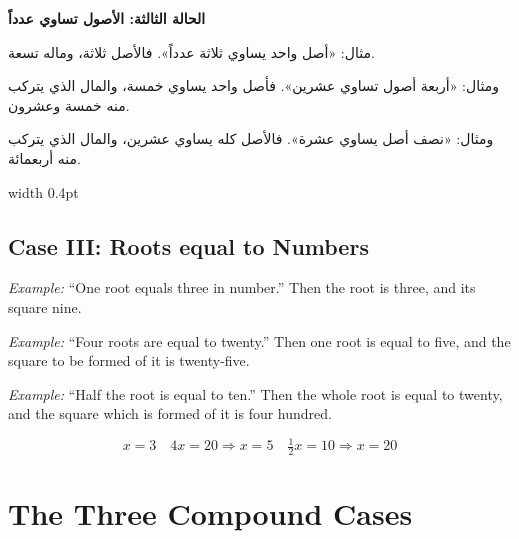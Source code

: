 \documentclass[11pt,a4paper,openany,oneside]{book}
\begin{document}
\noindent\begin{minipage}[t]{0.48\textwidth}
\raggedleft

\begin{Arabic}
\textbf{الحالة الثالثة: الأصول تساوي عدداً}

مثال: «أصل واحد يساوي ثلاثة عدداً». فالأصل ثلاثة، وماله تسعة.

ومثال: «أربعة أصول تساوي عشرين». فأصل واحد يساوي خمسة، والمال الذي يتركب منه خمسة وعشرون.

ومثال: «نصف أصل يساوي عشرة». فالأصل كله يساوي عشرين، والمال الذي يتركب منه أربعمائة.
\end{Arabic}

\end{minipage}%
\hfill\vrule width 0.4pt\hfill
\begin{minipage}[t]{0.48\textwidth}
\raggedright

\subsection*{Case III: Roots equal to Numbers}

\textit{Example:} ``One root equals three in number.'' Then the root is three, and its square nine.

\textit{Example:} ``Four roots are equal to twenty.'' Then one root is equal to five, and the square to be formed of it is twenty-five.

\textit{Example:} ``Half the root is equal to ten.'' Then the whole root is equal to twenty, and the square which is formed of it is four hundred.

\begin{equation}
\boxed{x = 3} \quad
\boxed{4x = 20 \Rightarrow x = 5} \quad
\boxed{\tfrac{1}{2}x = 10 \Rightarrow x = 20}
\end{equation}

\end{minipage}
\vspace{0.3cm}

\newpage

\section{The Three Compound Cases}
\end{document}
